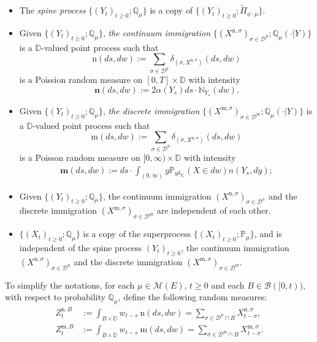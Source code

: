 \documentclass[12pt,a4paper]{amsart}
\numberwithin{equation}{section}
\theoremstyle{plain}
\theoremstyle{definition}
\begin{document}
\begin{itemize}
\item
  The \emph{spine process} $\{(Y_t)_{t\geq 0}; \mathbb Q_\mu\}$ is a copy of
  $\{(Y_t)_{t\geq 0}; \widetilde \Pi_{\phi\cdot\mu}\}$.
\item
  Given $\{(Y_t)_{t\geq 0}; \mathbb Q_\mu\}$, \emph{the continuum immigration} $\{ (X^{\mathrm n,\sigma})_{\sigma \in \mathcal D^\mathrm n};
  \mathbb Q_\mu(\cdot |Y)\}$ is a $\mathbb D$-valued point process such that
  \[
    \mathrm n(ds,dw) := \sum_{\sigma\in \mathcal D^{\mathrm n}} \delta_{(\sigma, X^{\mathrm n,\sigma})}(ds,dw)
  \]
  is a Poission random measure on $[0,T]\times \mathbb D$ with intensity
  \[
    \mathbf n(ds,dw):= 2 \alpha(Y_s) ds \cdot \mathbb N_{Y_s}(dw).
  \]
\item
  Given $\{(Y_t)_{t\geq 0}; \mathbb Q_\mu\}$, \emph{the discrete immigration} $\{(X^{\mathrm m,\sigma})_{\sigma\in \mathcal D^{\mathrm m}};
  \mathbb Q_\mu(\cdot |Y)\}$ is a $\mathbb D$-valued point process such that
  \[
    \mathrm m(ds,dw) := \sum_{\sigma\in \mathcal D^{\mathrm n}} \delta_{(\sigma, X^{\mathrm n,\sigma})}(ds,dw)
  \]
  is a Poisson random measure on $[0,\infty ) \times \mathbb D$ with intensity
  \begin{align}\label{eq:meanMeasImmigr}
    \mathbf m(ds,dw):= ds \cdot \int_{(0,\infty)} y \mathbb P_{y\delta_{Y_s}}(X\in dw) n(Y_s,dy);
  \end{align}
\item
  Given $\{(Y_t)_{t\geq 0}; \mathbb Q_\mu\}$, the continuum immigration $(X^{\mathrm n,\sigma})_{\sigma \in \mathcal D^n}$ and the discrete immigration $(X^{\mathrm m,\sigma})_{\sigma\in \mathcal D^{\mathrm m}}$ are independent of each other.
\item
	$\{(X_t)_{t\geq 0}; \mathbb Q_\mu\}$ is a copy of the superprocess $\{(X_t)_{t\geq 0}; \mathbb P_\mu\}$, and is independent of the spine process $(Y_t)_{t\geq 0}$, the continuum immigration $(X^{\mathrm n,\sigma})_{\sigma
    \in \mathcal D^\mathrm n}$ and the discrete immigration $(X^{\mathrm
    m,\sigma})_{\sigma\in \mathcal D^{\mathrm m}}$.
\end{itemize}

To simplify the notations, for each $\mu \in \mathcal M(E)$, $t\geq 0$ and each
$B \in \mathscr B([0,t))$, with respect to probability $\mathbb Q_\mu$, define
the following random measures:
\begin{align}
	Z^{\mathrm n,B}_t
	&:= \int_{B\times \mathbb D} w_{t-s} ~\mathrm n (ds,dw)
   = \sum_{\sigma \in \mathcal D^\mathrm n \cap B} X^{\mathrm n,\sigma}_{t-\sigma},
	\\ Z^{\mathrm m,B}_t
	&:= \int_{B\times \mathbb D} w_{t-s} ~\mathrm m (ds,dw)
   = \sum_{\sigma \in \mathcal D^\mathrm m \cap B} X^{\mathrm m,\sigma}_{t-\sigma}.
\end{align}
\end{document}
